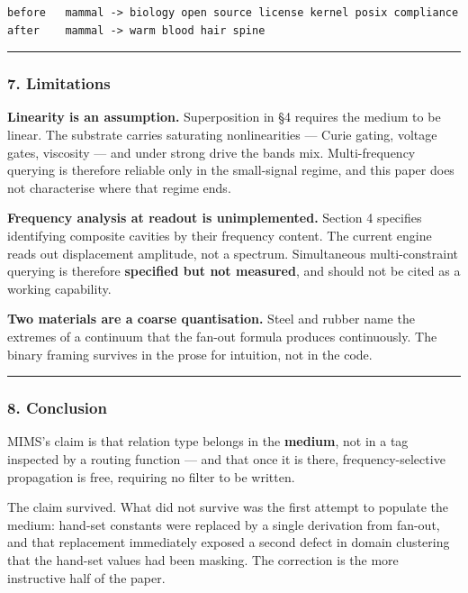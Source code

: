 \documentclass[
  11pt,
  a4paper,
]{article}
\begin{document}
\begin{verbatim}
before   mammal -> biology open source license kernel posix compliance
after    mammal -> warm blood hair spine
\end{verbatim}

\begin{center}\rule{0.5\linewidth}{0.5pt}\end{center}

\subsubsection{7. Limitations}\label{limitations-1}

\textbf{Linearity is an assumption.} Superposition in §4 requires the
medium to be linear. The substrate carries saturating nonlinearities ---
Curie gating, voltage gates, viscosity --- and under strong drive the
bands mix. Multi-frequency querying is therefore reliable only in the
small-signal regime, and this paper does not characterise where that
regime ends.

\textbf{Frequency analysis at readout is unimplemented.} Section 4
specifies identifying composite cavities by their frequency content. The
current engine reads out displacement amplitude, not a spectrum.
Simultaneous multi-constraint querying is therefore \textbf{specified
but not measured}, and should not be cited as a working capability.

\textbf{Two materials are a coarse quantisation.} Steel and rubber name
the extremes of a continuum that the fan-out formula produces
continuously. The binary framing survives in the prose for intuition,
not in the code.

\begin{center}\rule{0.5\linewidth}{0.5pt}\end{center}

\subsubsection{8. Conclusion}\label{conclusion-2}

MIMS's claim is that relation type belongs in the \textbf{medium}, not
in a tag inspected by a routing function --- and that once it is there,
frequency-selective propagation is free, requiring no filter to be
written.

The claim survived. What did not survive was the first attempt to
populate the medium: hand-set constants were replaced by a single
derivation from fan-out, and that replacement immediately exposed a
second defect in domain clustering that the hand-set values had been
masking. The correction is the more instructive half of the paper.
\end{document}
